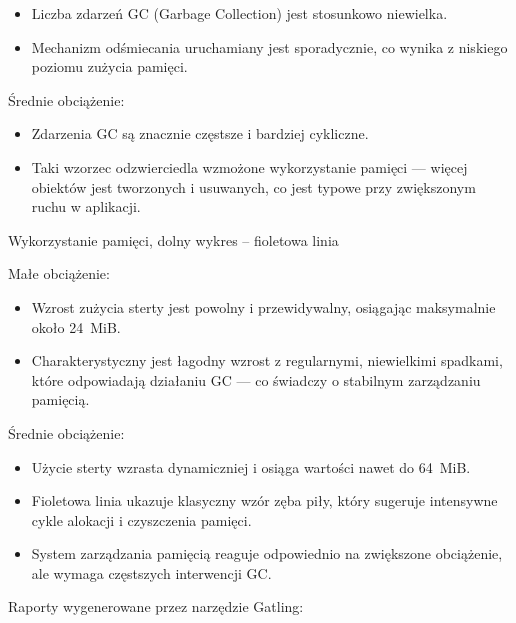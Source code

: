 \documentclass[runningheads,12pt]{llncs}
\begin{document}
\begin{itemize}
  \item Liczba zdarzeń GC (Garbage Collection) jest stosunkowo niewielka.
  \item Mechanizm odśmiecania uruchamiany jest sporadycznie, co wynika z niskiego poziomu zużycia pamięci.
\end{itemize}

Średnie obciążenie:

\begin{itemize}
  \item Zdarzenia GC są znacznie częstsze i bardziej cykliczne.
  \item Taki wzorzec odzwierciedla wzmożone wykorzystanie pamięci — więcej obiektów jest tworzonych i usuwanych, co jest typowe przy zwiększonym ruchu w aplikacji.
\end{itemize}

\vspace{0.5cm}

Wykorzystanie pamięci, dolny wykres – fioletowa linia

Małe obciążenie:

\begin{itemize}
  \item Wzrost zużycia sterty jest powolny i przewidywalny, osiągając maksymalnie około 24~MiB.
  \item Charakterystyczny jest łagodny wzrost z regularnymi, niewielkimi spadkami, które odpowiadają działaniu GC — co świadczy o stabilnym zarządzaniu pamięcią.
\end{itemize}

Średnie obciążenie:

\begin{itemize}
  \item Użycie sterty wzrasta dynamiczniej i osiąga wartości nawet do 64~MiB.
  \item Fioletowa linia ukazuje klasyczny wzór zęba piły, który sugeruje intensywne cykle alokacji i czyszczenia pamięci.
  \item System zarządzania pamięcią reaguje odpowiednio na zwiększone obciążenie, ale wymaga częstszych interwencji GC.
\end{itemize}

\newpage

Raporty wygenerowane przez narzędzie Gatling:

\end{document}
